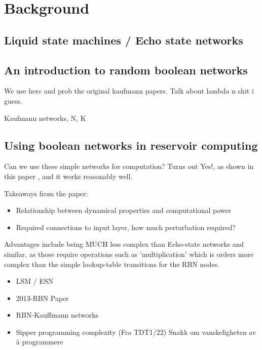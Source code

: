 \section{Background}

\subsection{Liquid state machines / Echo state networks}

\subsection{An introduction to random boolean networks}

We use \cite{gershenson2004introduction} here and prob the original kaufmann papers.
Talk about lambda n shit i guess.

Kaufmann networks, N, K

\subsection{Using boolean networks in reservoir computing}

Can we use these simple networks for computation?
Turns out Yes!, as shown in this paper \cite{rbn-reservoir}, and it works reasonably well.

Takeaways from the paper:
\begin{itemize}
  \item Relationship between dynamical properties and computational power
  \item Required connections to input layer, how much perturbation required?
\end{itemize}

Advantages include being MUCH less complex than Echo-state networks and similar, as those require operations such as 'multiplication' which is orders more complex than the simple lookup-table transitions for the RBN nodes.


\begin{itemize}
  \item LSM / ESN
  \item 2013-RBN Paper
  \item RBN-Kauffmann networks
  \item Sipper programming complexity (Fra TDT1/22) Snakk om vanskeligheten av å programmere
\end{itemize}
